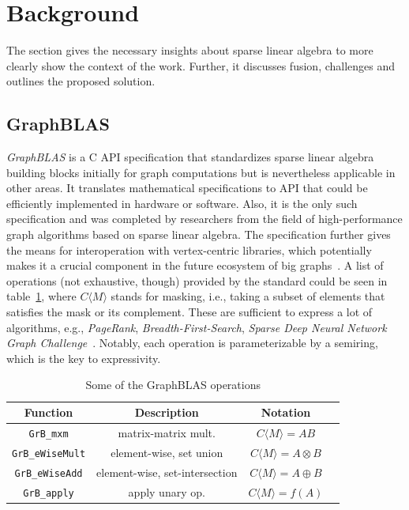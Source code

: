 \section{Background}
The section gives the necessary insights about sparse linear algebra to more clearly show the context of the work. Further, it discusses fusion, challenges and outlines the proposed solution. 

\subsection{GraphBLAS}\label{graphblas}
\emph{GraphBLAS} is a C API specification that standardizes sparse linear algebra building blocks initially for graph computations but is nevertheless applicable in other areas. It translates mathematical specifications to API that could be efficiently implemented in hardware or software. Also, it is the only such specification and was completed by researchers from the field of high-performance graph algorithms based on sparse linear algebra. The specification further gives the means for interoperation with vertex-centric libraries, which potentially makes it a crucial component in the future ecosystem of big graphs~\cite{sakr2020future}. A list of operations (not exhaustive, though) provided by the standard could be seen in table~\ref{tab:table_blass}, where $C\langle M \rangle$ stands for masking, i.e., taking a subset of elements that satisfies the mask or its complement. These are sufficient to express a lot of algorithms, e.g., \emph{PageRank}, \emph{Breadth-First-Search}, \emph{Sparse Deep Neural Network Graph Challenge}~\cite{SparseDNN}. Notably, each operation is parameterizable by a semiring, which is the key to expressivity. 

\begin{table}[b]
    \centering
    \begin{tabular}{ |c|c|c|c| } 
\hline
\rowcolor{LightBlue}
Function & Description & Notation \\
\hline
\texttt{GrB\_mxm} & matrix-matrix mult. & $C \langle M \rangle = AB$ \\ 
\texttt{GrB\_eWiseMult} & element-wise, set union &
$C\langle M \rangle = A \otimes B$\\ 
\texttt{GrB\_eWiseAdd} & element-wise, set-intersection  & $C \langle M \rangle = A \oplus B$ \\
\texttt{GrB\_apply} & apply unary op. & $C\langle M \rangle = f(A)$\\
\hline
\end{tabular}
    \caption{Some of the GraphBLAS operations}
    \label{tab:table_blass}
\end{table}


